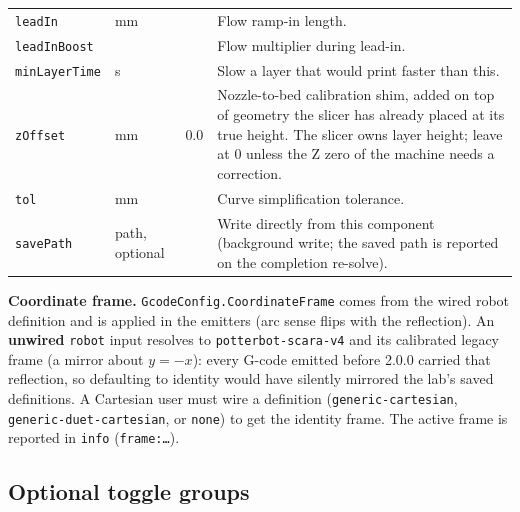 \documentclass[11pt]{article}
\newcommand{\param}[1]{\texttt{#1}}
\begin{document}
\begin{longtable}{@{}p{3.4cm}p{1.8cm}p{1.6cm}p{6.5cm}@{}}
\param{leadIn} & mm & & Flow ramp-in length. \\
\param{leadInBoost} & & & Flow multiplier during lead-in. \\
\param{minLayerTime} & s & & Slow a layer that would print faster than this. \\
\param{zOffset} & mm & 0.0 & Nozzle-to-bed calibration shim, added on top of geometry the slicer has already placed at its true height. The slicer owns layer height; leave at 0 unless the Z zero of the machine needs a correction. \\
\param{tol} & mm & & Curve simplification tolerance. \\
\param{savePath} & path, optional & & Write directly from this component (background write; the saved path is reported on the completion re-solve). \\
\bottomrule
\end{longtable}

\textbf{Coordinate frame.} \param{GcodeConfig.CoordinateFrame} comes from
the wired robot definition and is applied in the emitters (arc sense
flips with the reflection). An \textbf{unwired} \param{robot} input
resolves to \param{potterbot-scara-v4} and its calibrated legacy frame
(a mirror about $y = -x$): every G-code emitted before 2.0.0 carried
that reflection, so defaulting to identity would have silently mirrored
the lab's saved definitions. A Cartesian user must wire a definition
(\param{generic-cartesian}, \param{generic-duet-cartesian}, or
\param{none}) to get the identity frame. The active frame is reported in
\param{info} (\texttt{frame:\ldots}).

\subsection{Optional toggle groups}
\end{document}
